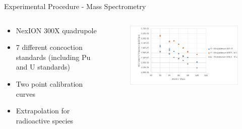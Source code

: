 \documentclass{beamer}
\begin{document}
\begin{frame}{Experimental Procedure - Mass Spectrometry}
  \begin{columns}
    \begin{column}{0.35\textwidth}
      \vspace{-10mm}
      \begin{itemize}
      \item{NexION 300X quadrupole}
      \item{7 different concoction standards (including Pu and U standards)}
      \item{Two point calibration curves}
      \item{Extrapolation for radioactive species}
      \end{itemize}
    \end{column}
    \begin{column}{0.65\textwidth}
      \begin{figure}[H]
        \vspace*{-1cm}
        \begin{center}
	  \includegraphics[scale = 0.45]{figures/instrument_response}
	\end{center}
      \end{figure}
    \end{column}
  \end{columns}  
\end{frame}
\end{document}
